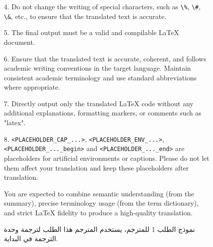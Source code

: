 \documentclass[11pt]{article}
\begin{document}
\begin{figure}[htbp]
\begin{tcolorbox}[title=Prompt Template 1 for Translator, halign=left]
4. Do not change the writing of special characters, such as \texttt{\textbackslash\%}, \texttt{\textbackslash\#}, \texttt{\textbackslash\&}, etc., to ensure that the translated text is accurate.

5. The final output must be a valid and compilable LaTeX document.

6. Ensure that the translated text is accurate, coherent, and follows academic writing conventions in the target language. Maintain consistent academic terminology and use standard abbreviations where appropriate.

7. Directly output only the translated LaTeX code without any additional explanations, formatting markers, or comments such as "latex".

8. \texttt{<PLACEHOLDER\_CAP\_...>}, \texttt{<PLACEHOLDER\_ENV\_...>}, \texttt{<PLACEHOLDER\_...\_begin>} and \texttt{<PLACEHOLDER\_...\_end>} are placeholders for artificial environments or captions. Please do not let them affect your translation and keep these placeholders after translation.

\vspace{2mm}
You are expected to combine semantic understanding (from the summary), precise terminology usage (from the term dictionary), and strict LaTeX fidelity to produce a high-quality translation.
\end{tcolorbox}
\caption{نموذج الطلب 1 للمترجم، يستخدم المترجم هذا الطلب لترجمة وحدة الترجمة في البداية.}
    \label{fig:translator prompt 1}
\end{figure}
\end{document}
